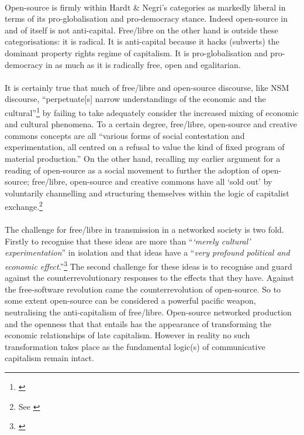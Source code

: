 \documentclass[11pt,titlepage]{book}
\begin{document}
\paragraph{}Open-source is firmly within Hardt \& Negri's categories as markedly liberal in terms of its pro-globalisation and pro-democracy stance. Indeed open-source in and of itself is not anti-capital. Free/libre on the other hand is outside these categorisations: it is radical. It is anti-capital because it hacks (subverts) the dominant property rights regime of capitalism. It is pro-globalisation and pro-democracy in as much as it is radically free, open and egalitarian.

\paragraph{}It is certainly true that much of free/libre and open-source discourse, like NSM discourse, ``perpetuate[s] narrow understandings of the economic and the cultural''\footnote{\cite[p. 275]{Hardt:2001jl}} by failing to take adequately  consider the increased mixing of economic and cultural phenomena. To a certain degree, free/libre, open-source and creative commons concepts are all ``various forms of social contestation and experimentation, all centred on a refusal to value the kind of fixed program of material production.'' On the other hand, recalling my earlier argument for a reading of open-source as a social movement to further the adoption of open-source; free/libre, open-source and creative commons have all `sold out' by voluntarily channelling and structuring themselves within the logic of capitalist exchange.\footnote{See \cite[p. 80]{Terranova:2004ly}}

\paragraph{}The challenge for free/libre in transmission in a networked society is two fold. Firstly to recognise that these ideas are more than ``\textit{`merely cultural' experimentation}'' in isolation and that ideas have a ``\textit{very profound political and economic effect}.''\footnote{\cite[p. 274, original emphasis]{Hardt:2001jl}} The second challenge for these ideas is to recognise and guard against the counterrevolutionary responses to the effects that they have. Against the free-software revolution came the counterrevolution of open-source. So to some extent open-source can be considered a powerful pacific weapon, neutralising the anti-capitalism of free/libre. Open-source networked production and the openness that that entails has the appearance of transforming the economic relationships of late capitalism. However in reality no such transformation takes place as the fundamental logic(s) of communicative capitalism remain intact.
\end{document}
